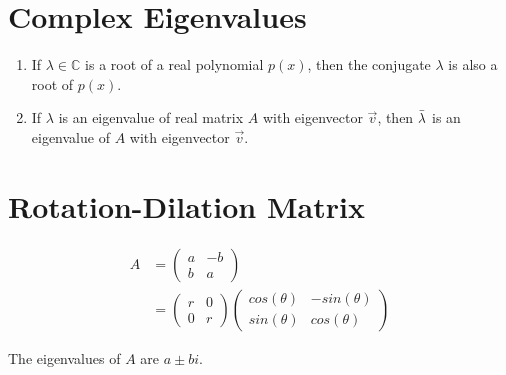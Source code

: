 \section{Complex Eigenvalues}
\begin{theorem}
\begin{enumerate} Complex Eigenvalues
    \item If \(\lambda \in \mathbb{C}\) is a root of a real polynomial \(p(x)\), then the conjugate \(\lambda\) is also a root of \(p(x)\).
    \item If \(\lambda\) is an eigenvalue of real matrix \(A\) with eigenvector \(\Vec{v}\), then \(\Bar{\lambda}\) is an eigenvalue of \(A\) with eigenvector \(\Vec{v}\).
\end{enumerate}
\end{theorem}

\section{Rotation-Dilation Matrix}
\begin{align}
    A &= \begin{pmatrix}
        a & -b \\ b & a
    \end{pmatrix} \\
    &= \begin{pmatrix}
        r & 0 \\ 0 & r
    \end{pmatrix}
    \begin{pmatrix}
        cos(\theta) & -sin(\theta) \\ sin(\theta) & cos(\theta)
    \end{pmatrix}
\end{align}

\noindent
The eigenvalues of \(A\) are \(a \pm bi\).